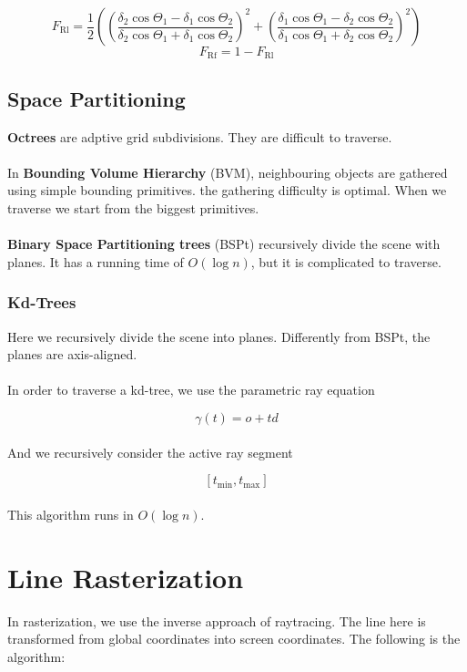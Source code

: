 \documentclass{article}
\begin{document}
\[ F_{\text{Rl}} = \frac{1}{2} \left( \left( \frac{\delta_2 \cos\Theta_1 - \delta_1 \cos \Theta_2}{\delta_2 \cos\Theta_1 + \delta_1 \cos \Theta_2} \right)^2 + \left( \frac{\delta_1 \cos\Theta_1 - \delta_2 \cos \Theta_2}{\delta_1 \cos\Theta_1 + \delta_2 \cos \Theta_2} \right)^2 \right) \]
\[ F_{\text{Rf}} = 1 - F_{\text{Rl}} \]

\subsection{Space Partitioning}
\textbf{Octrees} are adptive grid subdivisions. They are difficult to traverse. \\ \\
In \textbf{Bounding Volume Hierarchy} (BVM), neighbouring objects are gathered using simple bounding primitives. the gathering difficulty is optimal. When we traverse we start from the biggest primitives. \\ \\
\textbf{Binary Space Partitioning trees} (BSPt) recursively divide the scene with planes. It has a running time of $O(\log n)$, but it is complicated to traverse.

\subsubsection{Kd-Trees}
Here we recursively divide the scene into planes. Differently from BSPt, the planes are axis-aligned. \\ \\
In order to traverse a kd-tree, we use the parametric ray equation

\[ \gamma(t) = o + td \] \\
And we recursively consider the active ray segment

\[ [t_{\min}, t_{\max} ] \] \\
This algorithm runs in $O(\log n)$.

\section{Line Rasterization}
In rasterization, we use the inverse approach of raytracing. The line here is transformed from global coordinates into screen coordinates. The following is the algorithm:
\end{document}
